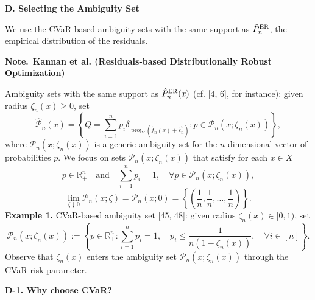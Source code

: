 \documentclass[10pt,a4paper]{article}
\newcommand{\proj}{\operatorname{proj}}
\newcommand{\note}{\textbf{Note.}\ }
\begin{document}
\textbf{D. Selecting the Ambiguity Set}

We use the CVaR-based ambiguity sets with the same support as $\hat P_n^{\rm ER}$, the empirical distribution of the residuals.
\begin{mdframed}[linewidth=0.6pt]
\footnotesize
\note \textbf{Kannan et al. (Residuals-based Distributionally Robust Optimization)}

Ambiguity sets with the same support as $\hat P_n^{\rm ER}(x)$ (cf. [4, 6], for instance): given radius $\zeta_n(x)\ge0$, set
\[
\hat{\mathcal P}_n(x)=\left\{Q=\sum_{i=1}^np_i\delta_{\proj_Y(\hat f_n(x)+\hat\varepsilon_n^i)}:p\in\mathcal P_n(x;\zeta_n(x))\right\},
\]
where $\mathcal P_n(x;\zeta_n(x))$ is a generic ambiguity set for the $n$-dimensional vector of probabilities $p$. We focus on sets $\mathcal P_n(x;\zeta_n(x))$ that satisfy for each $x\in X$
\[
p\in\mathbb R_+^n\quad\text{and}\quad\sum_{i=1}^np_i=1,\quad\forall p\in\mathcal P_n(x;\zeta_n(x)),
\]
\begin{equation*}
\lim_{\zeta\downarrow0}\mathcal P_n(x;\zeta)=\mathcal P_n(x;0)=\left\{\left(\frac1n,\frac1n,\ldots,\frac1n\right)\right\}.\tag{8}
\end{equation*}
\textbf{Example 1.} CVaR-based ambiguity set [45, 48]: given radius $\zeta_n(x)\in[0,1)$, set
\[
\mathcal P_n(x;\zeta_n(x)):=\left\{p\in\mathbb R_+^n:\sum_{i=1}^np_i=1,\quad p_i\le\frac1{n(1-\zeta_n(x))},\quad\forall i\in[n]\right\}.
\]
Observe that $\zeta_n(x)$ enters the ambiguity set $\mathcal P_n(x;\zeta_n(x))$ through the CVaR risk parameter.
\end{mdframed}

\textbf{D-1. Why choose CVaR?}
\end{document}
